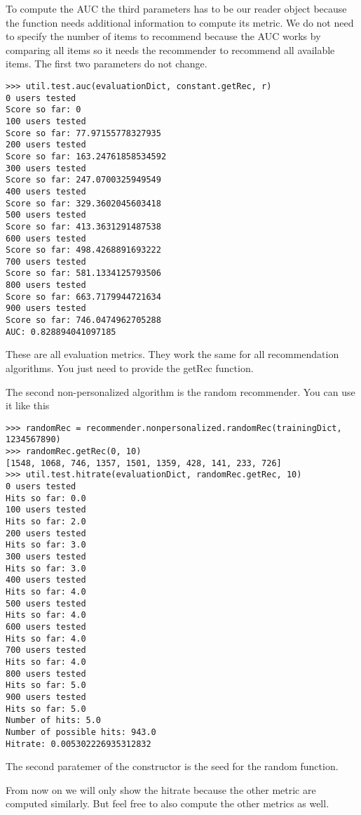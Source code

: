 To compute the AUC the third parameters has to be our reader object because
the function needs additional information to compute its metric.
We do not need to specify the number of items to recommend because
the AUC works by comparing all items so it needs the recommender
to recommend all available items.
The first two parameters do not change.
\begin{lstlisting}
>>> util.test.auc(evaluationDict, constant.getRec, r)
0 users tested
Score so far: 0
100 users tested
Score so far: 77.97155778327935
200 users tested
Score so far: 163.24761858534592
300 users tested
Score so far: 247.0700325949549
400 users tested
Score so far: 329.3602045603418
500 users tested
Score so far: 413.3631291487538
600 users tested
Score so far: 498.4268891693222
700 users tested
Score so far: 581.1334125793506
800 users tested
Score so far: 663.7179944721634
900 users tested
Score so far: 746.0474962705288
AUC: 0.828894041097185
\end{lstlisting}

These are all evaluation metrics. They work the same for all 
recommendation algorithms. You just need to provide the getRec function.

The second non-personalized algorithm is the random recommender.
You can use it like this
\begin{lstlisting}
>>> randomRec = recommender.nonpersonalized.randomRec(trainingDict, 1234567890)
>>> randomRec.getRec(0, 10)
[1548, 1068, 746, 1357, 1501, 1359, 428, 141, 233, 726]
>>> util.test.hitrate(evaluationDict, randomRec.getRec, 10)
0 users tested
Hits so far: 0.0
100 users tested
Hits so far: 2.0
200 users tested
Hits so far: 3.0
300 users tested
Hits so far: 3.0
400 users tested
Hits so far: 4.0
500 users tested
Hits so far: 4.0
600 users tested
Hits so far: 4.0
700 users tested
Hits so far: 4.0
800 users tested
Hits so far: 5.0
900 users tested
Hits so far: 5.0
Number of hits: 5.0
Number of possible hits: 943.0
Hitrate: 0.005302226935312832
\end{lstlisting}
The second paratemer of the constructor is the seed for the random function.

From now on we will only show the hitrate because the other metric are computed
similarly. But feel free to also compute the other metrics as well.

